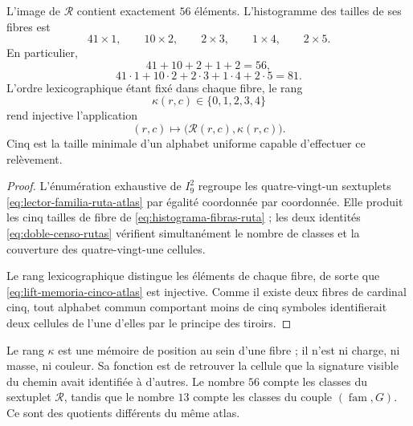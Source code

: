\begin{theorem}
\label{thm:censo-56-familias-ruta-rev6}
L'image de \(\mathcal R\) contient exactement \(56\) éléments.
L'histogramme des tailles de ses fibres est
\[
 41\times1,\qquad
 10\times2,\qquad
 2\times3,\qquad
 1\times4,\qquad
 2\times5.
 \tag{A7}\label{eq:histograma-fibras-ruta}
\]
En particulier,
\[
 41+10+2+1+2=56,
\]
\[
 41\cdot1+10\cdot2+2\cdot3+1\cdot4+2\cdot5=81.
 \tag{A8}\label{eq:doble-censo-rutas}
\]
L'ordre lexicographique étant fixé dans chaque fibre, le rang
\[
 \kappa(r,c)\in\{0,1,2,3,4\}
\]
rend injective l'application
\[
 (r,c)\longmapsto\bigl(\mathcal R(r,c),\kappa(r,c)\bigr).
 \tag{A9}\label{eq:lift-memoria-cinco-atlas}
\]
Cinq est la taille minimale d'un alphabet uniforme capable d'effectuer ce
relèvement.
\end{theorem}

\begin{proof}
L'énumération exhaustive de \(I_9^2\) regroupe les quatre-vingt-un sextuplets
\eqref{eq:lector-familia-ruta-atlas} par égalité coordonnée par coordonnée.
Elle produit les cinq tailles de fibre de
\eqref{eq:histograma-fibras-ruta} ; les deux identités
\eqref{eq:doble-censo-rutas} vérifient simultanément le nombre de classes
et la couverture des quatre-vingt-une cellules.

Le rang lexicographique distingue les éléments de chaque fibre, de sorte que
\eqref{eq:lift-memoria-cinco-atlas} est injective. Comme il existe deux fibres
de cardinal cinq, tout alphabet commun comportant moins de cinq symboles
identifierait deux cellules de l'une d'elles par le principe des tiroirs.
\end{proof}

Le rang \(\kappa\) est une mémoire de position au sein d'une fibre ; il n'est
ni charge, ni masse, ni couleur. Sa fonction est de retrouver la cellule que la signature visible
du chemin avait identifiée à d'autres. Le nombre \(56\) compte les classes du
sextuplet \(\mathcal R\), tandis que le nombre \(13\) compte les classes du couple
\((\operatorname{fam},G)\). Ce sont des quotients différents du même atlas.

